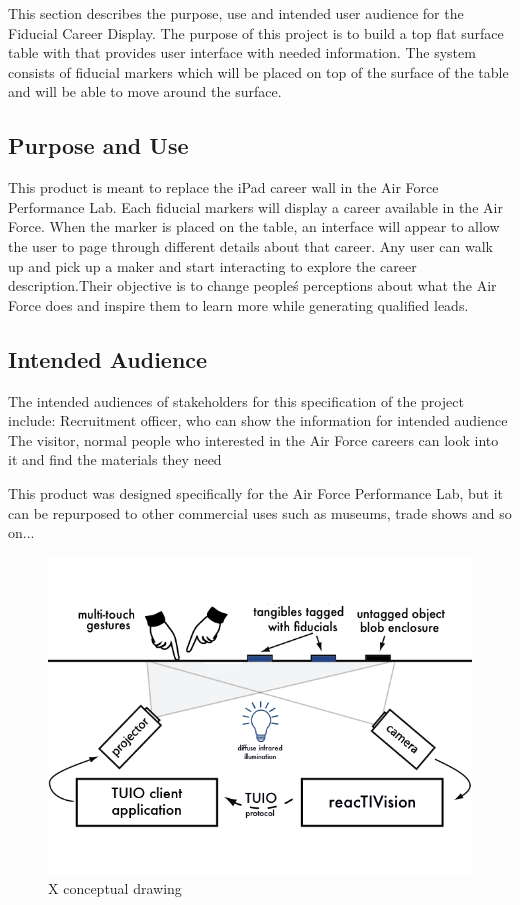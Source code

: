 This section describes the purpose, use and intended user audience for the Fiducial Career Display.
The purpose of this  project is to build a top flat surface table with that  provides user interface with needed information. The system consists of fiducial markers which will be placed on top of the surface of the table and will be able to move around the surface.

\subsection{Purpose and Use}
This product is meant to replace the iPad career wall in the Air Force Performance Lab. Each fiducial markers will display a career available in the Air Force. When the marker is placed on the table, an interface will appear to allow the user to page through different details about that career. Any user can walk up and pick up a maker and start interacting to explore the career description.Their objective is to change people\'s perceptions about what the Air Force does and inspire them to learn more while generating qualified leads.
\subsection{Intended Audience}
The intended audiences of stakeholders for this specification of the project include:
Recruitment officer, who can show the information for intended audience
The visitor, normal people who interested in the Air Force careers can look into it and find the materials they need

This product was designed specifically for the Air Force Performance Lab, but it can be repurposed to other commercial uses such as museums, trade shows and so on...
\begin{figure}[h!]
	\centering
   	\includegraphics[width=1\textwidth]{images/reactivision03}
    \caption{X conceptual drawing}
\end{figure}
